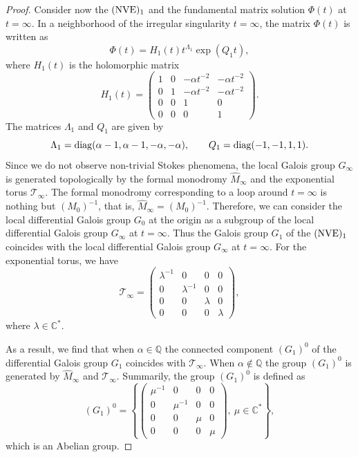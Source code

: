 \documentclass[pdftex]{sigma}
\numberwithin{equation}{section}
\begin{document}
\begin{proof}
 Consider now the $({\rm NVE})_1$ and the fundamental matrix solution $\Phi(t)$ at $t=\infty$. In a neighborhood of the irregular singularity $t=\infty$, the matrix $\Phi(t)$ is written
 as
 \[
 \Phi(t)=H_1(t) t^{\Lambda_1} \exp (Q_1 t) ,
 \]
 where $H_1(t)$ is the holomorphic matrix
 \[
 H_1(t)=\begin{pmatrix}
 1 & 0 & -\alpha t^{-2} & -\alpha t^{-2}\\
 0 & 1 & -\alpha t^{-2} & -\alpha t^{-2}\\
 0 & 0 & 1 & 0\\
 0 & 0 & 0 & 1
 \end{pmatrix} .
 \]
 The matrices $\Lambda_1$ and $Q_1$ are given by
 \[
 \Lambda_1={\rm diag} (\alpha-1, \alpha-1, -\alpha, -\alpha),\qquad
 Q_1={\rm diag}(-1, -1, 1, 1) .
 \]
 Since we do not observe non-trivial Stokes phenomena, the local Galois group $G_{\infty}$ is generated topologically by the formal monodromy $\hat{M}_{\infty}$ and the
 exponential torus $\mathcal{T}_{\infty}$. The formal monodromy corresponding to a loop around $t=\infty$ is nothing but $(M_0)^{-1}$, that is, $\hat{M}_{\infty}=(M_0)^{-1}$. Therefore, we can consider
 the local differential Galois group $G_0$ at the origin as a subgroup of the local differential Galois group $G_{\infty}$ at $t=\infty$. Thus the Galois group $G_1$ of the $({\rm NVE})_1$
 coincides with the local differential Galois group $G_{\infty}$ at $t=\infty$. For the exponential torus, we have
 \[
 \mathcal{T}_{\infty}=\begin{pmatrix}
 \lambda^{-1} & 0 & 0 & 0\\
 0 & \lambda^{-1} & 0 & 0\\
 0 & 0 & \lambda & 0\\
 0 & 0 & 0 & \lambda
 \end{pmatrix} ,
 \]
 where $\lambda\in\mathbb{C}^*$.

 As a result, we find that when $\alpha\in\mathbb{Q}$ the connected component $(G_1)^0$ of the differential Galois group $G_1$ coincides with $\mathcal{T}_{\infty}$. When $\alpha\notin\mathbb{Q}$ the group
 $(G_1)^0$ is generated by $\hat{M}_{\infty}$ and $\mathcal{T}_{\infty}$. Summarily, the group $(G_1)^0$ is defined as
 \[
 (G_1)^0=\left\{\begin{pmatrix}
 \mu^{-1} & 0 & 0 & 0\\
 0 & \mu^{-1} & 0 & 0\\
 0 & 0 & \mu & 0\\
 0 & 0 & 0 & \mu
 \end{pmatrix}, \ \mu\in\mathbb{C}^*\right\} ,
 \]
 which is an Abelian group.
 \end{proof}
\end{document}
